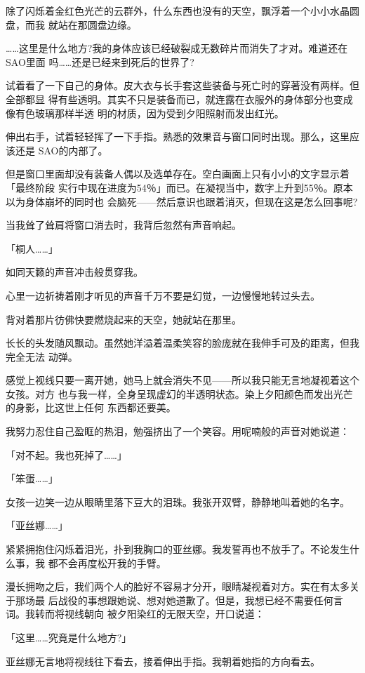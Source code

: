 \documentclass[11pt]{book}
\begin{document}
除了闪烁着金红色光芒的云群外，什么东西也没有的天空，飘浮着一个小小水晶圆盘，而我
就站在那圆盘边缘。

……这里是什么地方?我的身体应该已经破裂成无数碎片而消失了才对。难道还在SAO里面
吗……还是已经来到死后的世界了?

试着看了一下自己的身体。皮大衣与长手套这些装备与死亡时的穿著没有两样。但全部都显
得有些透明。其实不只是装备而已，就连露在衣服外的身体部分也变成像有色玻璃那样半透
明的材质，因为受到夕阳照射而发出红光。

伸出右手，试着轻轻挥了一下手指。熟悉的效果音与窗口同时出现。那么，这里应该还是
SAO的内部了。

但是窗口里面却没有装备人偶以及选单存在。空白画面上只有小小的文字显示着「最终阶段
实行中现在进度为54％」而已。在凝视当中，数字上升到55％。原本以为身体崩坏的同时也
会脑死——然后意识也跟着消灭，但现在这是怎么回事呢?

当我耸了耸肩将窗口消去时，我背后忽然有声音响起。

「桐人……」

如同天籁的声音冲击般贯穿我。

心里一边祈祷着刚才听见的声音千万不要是幻觉，一边慢慢地转过头去。

背对着那片彷佛快要燃烧起来的天空，她就站在那里。

长长的头发随风飘动。虽然她洋溢着温柔笑容的脸庞就在我伸手可及的距离，但我完全无法
动弹。

感觉上视线只要一离开她，她马上就会消失不见——所以我只能无言地凝视着这个女孩。对方
也与我一样，全身呈现虚幻的半透明状态。染上夕阳颜色而发出光芒的身影，比这世上任何
东西都还要美。

我努力忍住自己盈眶的热泪，勉强挤出了一个笑容。用呢喃般的声音对她说道：

「对不起。我也死掉了……」

「笨蛋……」

女孩一边笑一边从眼睛里落下豆大的泪珠。我张开双臂，静静地叫着她的名字。

「亚丝娜……」

紧紧拥抱住闪烁着泪光，扑到我胸口的亚丝娜。我发誓再也不放手了。不论发生什么事，我
都不会再度松开我的手臂。

漫长拥吻之后，我们两个人的脸好不容易才分开，眼睛凝视着对方。实在有太多关于那场最
后战役的事想跟她说、想对她道歉了。但是，我想已经不需要任何言词。我转而将视线朝向
被夕阳染红的无限天空，开口说道：

「这里……究竟是什么地方?」

亚丝娜无言地将视线往下看去，接着伸出手指。我朝着她指的方向看去。
\end{document}
